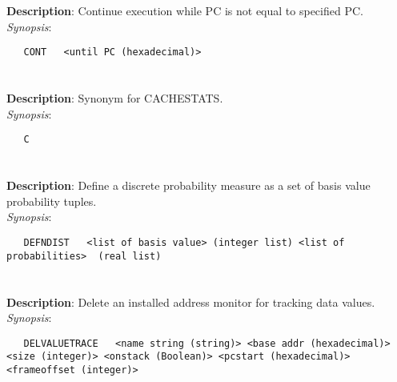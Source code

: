 \section{\quad{}}
\label{manpages:CONT}
\label{manpages:cont}
\vspace{-0.1in}
{\bf Description}: 	Continue execution while PC is not equal to specified PC.\\[1.5ex]
{\em Synopsis}:
\vspace{-0.05in}
\scriptsize
\begin{lstlisting}
   CONT   <until PC (hexadecimal)>				
\end{lstlisting}
\normalsize
\vspace{-0.05in}


\section{\quad{}}
\label{manpages:C}
\label{manpages:c}
\vspace{-0.1in}
{\bf Description}: 	Synonym for CACHESTATS.\\[1.5ex]
{\em Synopsis}:
\vspace{-0.05in}
\scriptsize
\begin{lstlisting}
   C   											
\end{lstlisting}
\normalsize
\vspace{-0.05in}


\section{\quad{}}
\label{manpages:DEFNDIST}
\label{manpages:defndist}
\vspace{-0.1in}
{\bf Description}: 	Define a discrete probability measure as a set of basis value probability tuples.\\[1.5ex]
{\em Synopsis}:
\vspace{-0.05in}
\scriptsize
\begin{lstlisting}
   DEFNDIST   <list of basis value> (integer list) <list of probabilities>	(real list)						
\end{lstlisting}
\normalsize
\vspace{-0.05in}


\section{\quad{}}
\label{manpages:DELVALUETRACE}
\label{manpages:delvaluetrace}
\vspace{-0.1in}
{\bf Description}: 	Delete an installed address monitor for tracking data values.\\[1.5ex]
{\em Synopsis}:
\vspace{-0.05in}
\scriptsize
\begin{lstlisting}
   DELVALUETRACE   <name string (string)> <base addr (hexadecimal)> <size (integer)> <onstack (Boolean)> <pcstart (hexadecimal)> <frameoffset (integer)>	
\end{lstlisting}
\normalsize
\vspace{-0.05in}


